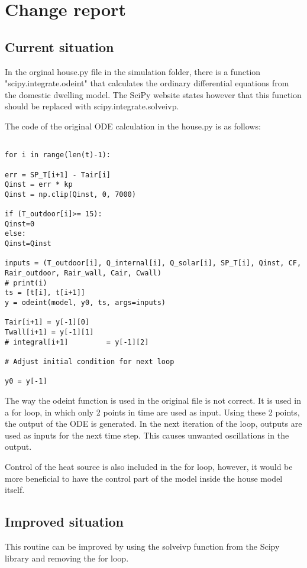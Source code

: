 \section{Change report}
\subsection{Current situation}

In the orginal house.py file in the simulation folder, there is a function "scipy.integrate.odeint"  that calculates the ordinary differential equations from the domestic dwelling model. The SciPy website states however that this function should be replaced with scipy.integrate.solveivp. 

The code of the original ODE calculation in the house.py is as follows:

\begin{lstlisting}

for i in range(len(t)-1):

err = SP_T[i+1] - Tair[i]
Qinst = err * kp
Qinst = np.clip(Qinst, 0, 7000)

if (T_outdoor[i]>= 15):
Qinst=0
else:
Qinst=Qinst

inputs = (T_outdoor[i], Q_internal[i], Q_solar[i], SP_T[i], Qinst, CF,
Rair_outdoor, Rair_wall, Cair, Cwall)
# print(i)
ts = [t[i], t[i+1]]
y = odeint(model, y0, ts, args=inputs)

Tair[i+1] = y[-1][0]
Twall[i+1] = y[-1][1]
# integral[i+1]         = y[-1][2]

# Adjust initial condition for next loop

y0 = y[-1]
\end{lstlisting}

The way the odeint function is used in the original file is not correct. It is used in a for loop, in which only 2 points in time are used as input. Using these 2 points, the output of the ODE is generated. In the next iteration of the loop, outputs are used as inputs for the next time step. This causes unwanted oscillations in the output.

Control of the heat source is also included in the for loop, however, it would be more beneficial to have the control part of the model inside the house model itself.

\subsection{Improved situation}

This routine can be improved by using the solveivp function from the Scipy library and removing the for loop.

